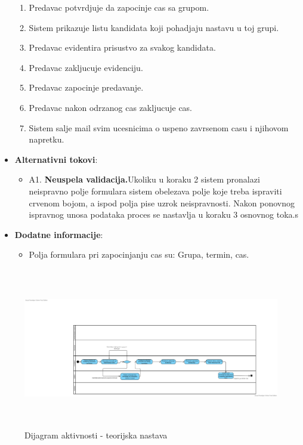 \begin{itemize}
\begin{enumerate}
        \item Predavac potvrdjuje da zapocinje cas sa grupom.
        \item Sistem prikazuje listu kandidata koji pohadjaju nastavu u toj grupi.
        \item Predavac evidentira prisustvo za svakog kandidata.
        \item Predavac zakljucuje evidenciju.
        \item Predavac zapocinje predavanje.
        \item Predavac nakon odrzanog cas zakljucuje cas.
        \item Sistem salje mail svim ucesnicima o uspeno zavrsenom casu i njihovom napretku.
      \end{enumerate}

  \item \textbf{Alternativni tokovi}:
      \begin{itemize}
        \item A1. \textbf{Neuspela validacija.}Ukoliku u koraku 2 sistem pronalazi neispravno polje formulara sistem obelezava polje koje treba ispraviti crvenom bojom, a ispod polja pise  uzrok neispravnosti. Nakon ponovnog ispravnog unosa podataka proces se nastavlja u koraku 3 osnovnog toka.s
      \end{itemize}
      
 \item \textbf{Dodatne informacije}:
      \begin{itemize}
        \item Polja formulara pri zapocinjanju cas su: Grupa, termin, cas.
      \end{itemize}
\end{itemize}

\begin{figure}[H]
  \begin{center}
      \includegraphics[width=140mm, height=70mm]{Diagrams/teorijska nastava dijagram.png}
  \end{center}
  \caption {Dijagram aktivnosti - teorijska nastava}
  \label{activity_diagram}

\end{figure}
